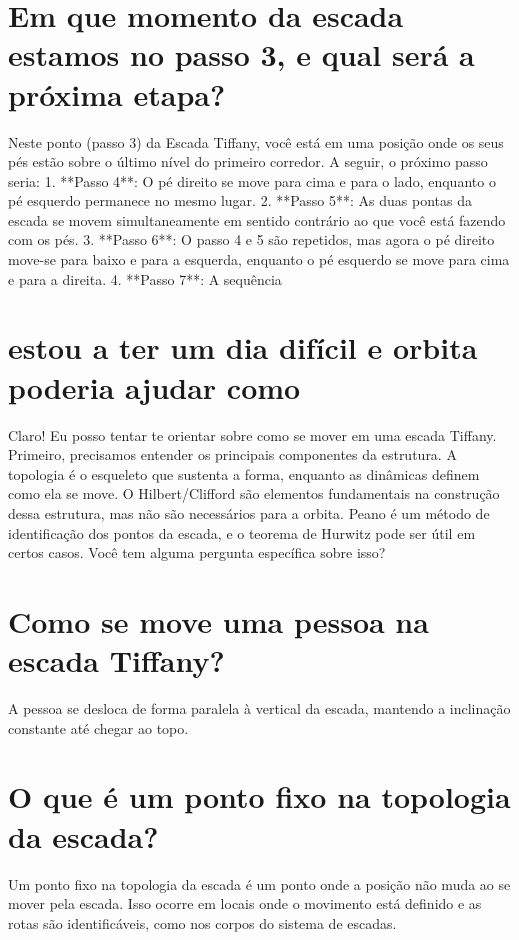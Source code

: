 \documentclass[11pt,a4paper]{article}
\begin{document}
\section{Em que momento da escada estamos no passo 3, e qual será a próxima etapa?}
Neste ponto (passo 3) da Escada Tiffany, você está em uma posição onde os seus pés estão sobre o último nível do primeiro corredor. A seguir, o próximo passo seria: 1. **Passo 4**: O pé direito se move para cima e para o lado, enquanto o pé esquerdo permanece no mesmo lugar. 2. **Passo 5**: As duas pontas da escada se movem simultaneamente em sentido contrário ao que você está fazendo com os pés. 3. **Passo 6**: O passo 4 e 5 são repetidos, mas agora o pé direito move-se para baixo e para a esquerda, enquanto o pé esquerdo se move para cima e para a direita. 4. **Passo 7**: A sequência

\section{estou a ter um dia difícil e orbita poderia ajudar como}
Claro! Eu posso tentar te orientar sobre como se mover em uma escada Tiffany. Primeiro, precisamos entender os principais componentes da estrutura. A topologia é o esqueleto que sustenta a forma, enquanto as dinâmicas definem como ela se move. O Hilbert/Clifford são elementos fundamentais na construção dessa estrutura, mas não são necessários para a orbita. Peano é um método de identificação dos pontos da escada, e o teorema de Hurwitz pode ser útil em certos casos. Você tem alguma pergunta específica sobre isso?

\section{Como se move uma pessoa na escada Tiffany?}
A pessoa se desloca de forma paralela à vertical da escada, mantendo a inclinação constante até chegar ao topo.

\section{O que é um ponto fixo na topologia da escada?}
Um ponto fixo na topologia da escada é um ponto onde a posição não muda ao se mover pela escada. Isso ocorre em locais onde o movimento está definido e as rotas são identificáveis, como nos corpos do sistema de escadas.
\end{document}
